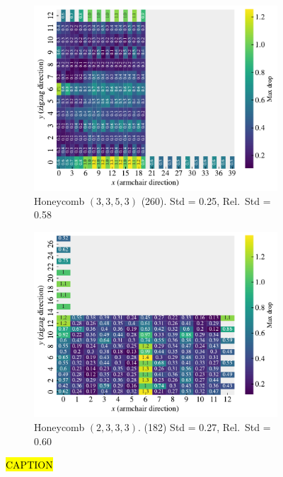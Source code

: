 \begin{figure}[H]
  \hfill
  \begin{subfigure}[t]{0.49\textwidth}
      \centering
      \includegraphics[width=\textwidth]{figures/search/ref_search_drop_hon_3_3_5_3_ref_search.pdf}
      \caption{Honeycomb $(3,3,5,3)$ (260). Std = 0.25, Rel.\ Std = 0.58}
  \end{subfigure}
  \hfill
  \begin{subfigure}[t]{0.49\textwidth}
      \centering
      \includegraphics[width=\textwidth]{figures/search/ref_search_drop_hon_2_3_3_3_ref_search.pdf}
      \caption{Honeycomb $(2,3,3,3)$. (182)  Std = 0.27, Rel.\ Std = 0.60}
  \end{subfigure}
  \hfill
  \caption{\hl{CAPTION}}
  \label{fig:ref_search_top_data}
\end{figure}


